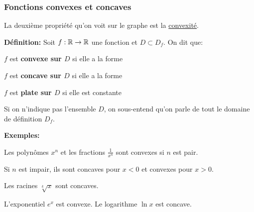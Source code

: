 \begin{frame}[plain]
\frametitle{\bf Fonctions convexes et concaves}
\medskip 

{\small 
La deuxi\`eme propri\'et\'e qu'on voit sur le graphe est la 
\underline{convexit\'e}.}
\vspace*{2mm}

{\bf D\'efinition:} 
Soit $f:\mathbb R\rightarrow\mathbb R$ une fonction et $D\subset D_f$. On dit que: 
\vspace*{1mm}

\begin{itemize}
\bitem
\parbox[t]{6cm}{
$f$ est {\bf convexe sur $D$} si elle a la forme 
}
\quad
\raisebox{-.5\height}{\convexe}  
\vspace*{1mm}

\bitem
\parbox[t]{6cm}{
$f$ est {\bf concave sur $D$} si elle a la forme
}
\quad
\raisebox{-.5\height}{\concave} 
\vspace*{1mm}

\bitem
\parbox[t]{6cm}{
$f$ est {\bf plate sur $D$} si elle est constante
}
\quad
\raisebox{-.5\height}{\constant}  
\end{itemize} 
\vspace*{1mm}

\pause
{\small
Si on n'indique pas l'ensemble $D$, on sous-entend qu'on parle de tout le 
domaine de d\'efinition $D_f$.
} 
\vspace*{2mm}

\pause
{\small 
{\bf Exemples:}
\begin{itemize}
\bitem
Les polyn\^omes $x^n$ et les fractions $\frac{1}{x^n}$ sont convexes si $n$ 
est pair. 
\vspace*{1mm}

Si $n$ est impair, ils sont concaves pour $x<0$ et convexes pour $x>0$.  
\vspace*{1mm}

\bitem
Les racines $\sqrt[k]{x}$ sont concaves. 
\vspace*{1mm}

\bitem
L'exponentiel $e^x$ est convexe. Le logarithme $\ln x$ est concave. 
\end{itemize} 
}

\end{frame}


